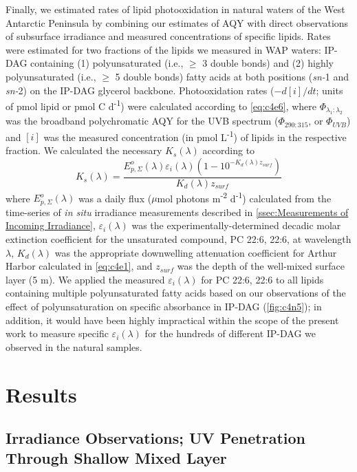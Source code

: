 Finally, we estimated rates of lipid photooxidation in natural waters of the West Antarctic Peninsula by combining our estimates of AQY with direct observations of subsurface irradiance and measured concentrations of specific lipids. Rates were estimated for two fractions of the lipids we measured in WAP waters: IP-DAG containing (1) polyunsaturated (i.e., $\geq$ 3 double bonds) and (2) highly polyunsaturated (i.e., $\geq$ 5 double bonds) fatty acids at both positions (\emph{sn-­}1 and \emph{sn-}2) on the IP-DAG glycerol backbone. Photooxidation rates ($ - d[i]/dt$; units of pmol lipid or pmol C d\textsuperscript{-1}) were calculated according to \autoref{eq:c4e6}, where ${\Phi _{{\lambda _1}:{\lambda _2}}}$ was the broadband polychromatic AQY for the UVB spectrum (${\Phi _{290:315}}$, or ${\Phi _{UVB}}$) and $[i]$ was the measured concentration (in pmol L\textsuperscript{-1}) of lipids in the respective fraction. We calculated the necessary ${K_s}(\lambda )$ according to
\begin{equation} \label{eq:c4e9}
{K_s}(\lambda ) = \frac{{E_{p,\Sigma }^o(\lambda ){\varepsilon _i}(\lambda )(1 - {{10}^{ - {K_d}(\lambda ){z_{surf}}}})}}{{{K_d}(\lambda ){z_{surf}}}}
\end{equation}	
where $E_{p,\Sigma }^o(\lambda )$ was a daily flux ($\mu$mol photons m\textsuperscript{-2} d\textsuperscript{-1}) calculated from the time-series of \emph{in situ} irradiance measurements described in \autoref{ssec:Measurements of Incoming Irradiance}, ${\varepsilon _i}(\lambda )$ was the experimentally-determined decadic molar extinction coefficient for the unsaturated compound, PC 22:6, 22:6, at wavelength $\lambda$, ${K_d}(\lambda )$ was the appropriate downwelling attenuation coefficient for Arthur Harbor calculated in \autoref{eq:c4e1}, and ${z_{surf}}$ was the depth of the well-mixed surface layer (5 m). We applied the measured ${\varepsilon _i}(\lambda )$ for PC 22:6, 22:6 to all lipids containing multiple polyunsaturated fatty acids based on our observations of the effect of polyunsaturation on specific absorbance in IP-DAG (\autoref{fig:c4n5}); in addition, it would have been highly impractical within the scope of the present work to measure specific ${\varepsilon _i}(\lambda )$ for the hundreds of different IP-DAG we observed in the natural samples.

\section{Results}
\subsection{Irradiance Observations; UV Penetration Through Shallow Mixed Layer}
\label{ssec:Irradiance Observations; UV Penetration Through Shallow Mixed Layer}

